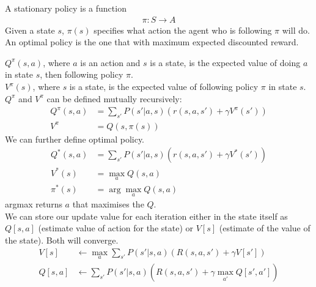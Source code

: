 \documentclass[a4paper]{article}
\theoremstyle{plain}
\theoremstyle{definition}
\newtheorem{defn}{Definition}[section]
\theoremstyle{remark}
\begin{document}
\begin{tcolorbox}[colback=black!3!white,colframe=black!60!white,title=\begin{defn}Stationary Policy \label{Stationary Policy}\end{defn}]
A stationary policy is a function
\begin{align}
\pi:S\to A
\end{align}
Given a state $s $, $\pi(s)$ specifies what action the agent who is following $\pi$ will do. An optimal policy is the one that with maximum expected discounted reward. 
\end{tcolorbox}
 $Q^{\pi}(s,a)$, where $a$ is an action and $s$ is a state, is the expected value of doing $a$ in state $s$, then following policy $\pi$.\\
 $V^{\pi}(s)$, where $s$ is a state, is the expected value of following policy $\pi$ in state $s$. $Q^{\pi}$ and $V^{\pi}$ can be defined mutually recursively:
 \begin{align*}
	 Q^{\pi}(s,a) &= \sum_{s'}^{} P(s'|a,s)(r(s,a,s')+\gamma V^{\pi}(s')) \\
	V^{\pi}&=Q(s,\pi(s))
 \end{align*}
 We can further define optimal policy.
 \begin{align*}
	 Q^{*}(s,a) &= \sum_{s'}^{} P(s'|a,s)(r(s,a,s')+\gamma V^{*}(s')) \\
	V^{*}(s) &= \max_{a}Q(s,a) \\
	\pi^{*}(s)&= \arg \max_{a}Q(s,a)
 \end{align*}
 argmax returns $a$ that maximises the $Q$. \\
 We can store our update value for each iteration either in the state itself as $Q[s,a]$ (estimate value of action for the state) or $V[s]$ (estimate of the value of the state). Both will converge.
 \begin{align*}
	 V[s] &\leftarrow \max_{a} \sum_{s'}^{} P(s'|s,a)(R(s,a,s')+\gamma V[s']) \\
	Q[s,a] &\leftarrow \sum_{s'}^{} P(s'|s,a)\left( R(s,a,s') + \gamma \max_{a'} Q[s',a'] \right) 
 \end{align*}
\end{document}
